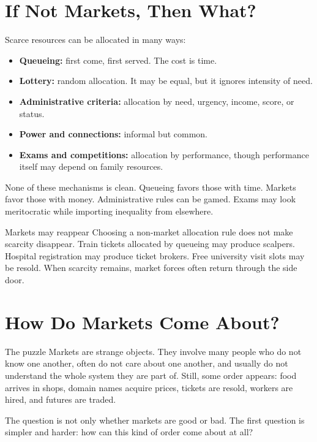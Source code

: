 \documentclass[10pt,a4paper]{article}
\begin{document}
\section{If Not Markets, Then What?}

Scarce resources can be allocated in many ways:

\begin{itemize}
  \item \textbf{Queueing:} first come, first served. The cost is time.
  \item \textbf{Lottery:} random allocation. It may be equal, but it ignores intensity of need.
  \item \textbf{Administrative criteria:} allocation by need, urgency, income, score, or status.
  \item \textbf{Power and connections:} informal but common.
  \item \textbf{Exams and competitions:} allocation by performance, though performance itself may depend on family resources.
\end{itemize}

None of these mechanisms is clean. Queueing favors those with time. Markets favor those with money. Administrative rules can be gamed. Exams may look meritocratic while importing inequality from elsewhere.

\begin{insightbox}{Markets may reappear}
Choosing a non-market allocation rule does not make scarcity disappear. Train tickets allocated by queueing may produce scalpers. Hospital registration may produce ticket brokers. Free university visit slots may be resold. When scarcity remains, market forces often return through the side door.
\end{insightbox}

\section{How Do Markets Come About?}

\begin{keybox}{The puzzle}
Markets are strange objects. They involve many people who do not know one another, often do not care about one another, and usually do not understand the whole system they are part of. Still, some order appears: food arrives in shops, domain names acquire prices, tickets are resold, workers are hired, and futures are traded.

The question is not only whether markets are good or bad. The first question is simpler and harder: how can this kind of order come about at all?
\end{keybox}
\end{document}
